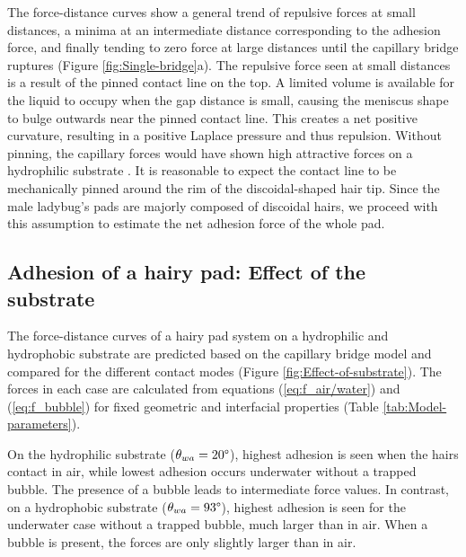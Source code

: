 \documentclass[vruler,JEB]{COB}%
\makeatletter
\newcommand{\lyxmathsym}[1]{\ifmmode\begingroup\def\b@ld{bold}
  \text{\ifx\math@version\b@ld\bfseries\fi#1}\endgroup\else#1\fi}
\makeatother
\begin{document}
The force-distance curves show a general trend of repulsive forces
at small distances, a minima at an intermediate distance corresponding to the adhesion force, and finally tending to zero force at large distances until the capillary bridge ruptures (Figure \ref{fig:Single-bridge}a). The repulsive force seen at small distances is a result
of the pinned contact line on the top. A limited volume is available
for the liquid to occupy when the gap distance is small, causing the
meniscus shape to bulge outwards near the pinned contact line. This
creates a net positive curvature, resulting in a positive Laplace
pressure and thus repulsion. Without pinning, the capillary forces
would have shown high attractive forces on a hydrophilic substrate \citep{RN93}. 
It is reasonable to expect the contact line to be mechanically pinned around the rim of the discoidal-shaped hair tip.
Since the male ladybug's pads are majorly composed of discoidal hairs, we proceed with this assumption to estimate the net adhesion
force of the whole pad.
\subsection{Adhesion of a hairy pad: Effect of the substrate\label{subsec:Capillary-Bridge-Model:}}

The force-distance curves of a hairy pad system on a hydrophilic
and hydrophobic substrate are predicted based on the capillary bridge
model and compared for the different contact modes (Figure \ref{fig:Effect-of-substrate}).
The forces in each case are calculated from equations (\ref{eq:f_air/water})
and (\ref{eq:f_bubble}) for fixed geometric and interfacial properties
(Table \ref{tab:Model-parameters}). 

On the hydrophilic substrate ($\theta_{wa}=20\lyxmathsym{\textdegree}$),
highest adhesion is seen when the hairs contact in air, while lowest
adhesion occurs underwater without a trapped bubble. The presence
of a bubble leads to intermediate force values. In contrast, on a
hydrophobic substrate ($\theta_{wa}=93\lyxmathsym{\textdegree}$),
highest adhesion is seen for the underwater case without a trapped
bubble, much larger than in air. When a bubble is present, the forces
are only slightly larger than in air. 
\end{document}
